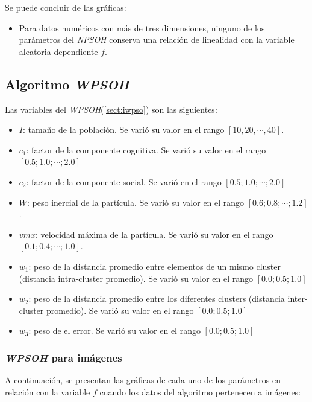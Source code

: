 	Se puede concluir de las gráficas:
\begin{itemize}
	\item Para datos numéricos con más de tres dimensiones, ninguno de los
parámetros del \emph{NPSOH} conserva una relación de linealidad con la variable
aleatoria dependiente $f$.
\end{itemize}

\subsection{Algoritmo \emph{WPSOH}}\label{sect:iwpso-rv}

    Las variables del \emph{WPSOH}(\ref{sect:iwpso}) son las siguientes:
\begin{itemize}
    \item $I$: tamaño de la población. Se varió su valor en el rango
$[10, 20, \cdots, 40]$.
    \item $c_1$: factor de la componente cognitiva. Se varió su valor en el
rango $[0.5; 1.0; \cdots; 2.0]$
    \item $c_2$: factor de la componente social. Se varió en el rango
$[0.5; 1.0; \cdots; 2.0]$
    \item $W$: peso inercial de la partícula. Se varió su valor en el rango
$[0.6; 0.8; \cdots; 1.2]$.
    \item $vmx$: velocidad máxima de la partícula. Se varió su valor en el rango
$[0.1; 0.4; \cdots; 1.0]$.
	\item $w_1$: peso de la distancia promedio entre elementos de un
mismo cluster (distancia intra-cluster promedio). Se varió su valor en el rango
$[0.0; 0.5; 1.0]$
	\item $w_2$: peso de la distancia promedio entre los diferentes
clusters (distancia inter-cluster promedio). Se varió su valor en el rango
$[0.0; 0.5; 1.0]$
	\item $w_3$: peso de el error. Se varió su valor en el rango
$[0.0; 0.5; 1.0]$
\end{itemize}

\subsubsection{\emph{WPSOH} para imágenes}

	A continuación, se presentan las gráficas de cada uno de los
parámetros en relación con la variable $f$ cuando los datos
del algoritmo pertenecen a imágenes:


